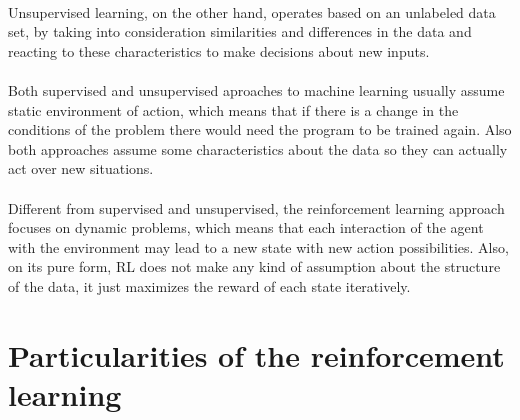 \documentclass{article}
\begin{document}
\paragraph{}
Unsupervised learning, on the other hand, operates based on an unlabeled data set, by taking into consideration similarities and differences in the data and reacting to these characteristics to make decisions about new inputs.

\paragraph{}
Both supervised and unsupervised aproaches to machine learning usually assume static environment of action, which means that if there is a change in the conditions of the problem there would need the program to be trained again. Also both approaches assume some characteristics about the data so they can actually act over new situations.

\paragraph{}
Different from supervised and unsupervised, the reinforcement learning approach focuses on dynamic problems, which means that each interaction of the agent with the environment may lead to a new state with new action possibilities. Also, on its pure form, RL does not make any kind of assumption about the structure of the data, it just maximizes the reward of each state iteratively.

\section{Particularities of the reinforcement learning}
\end{document}
